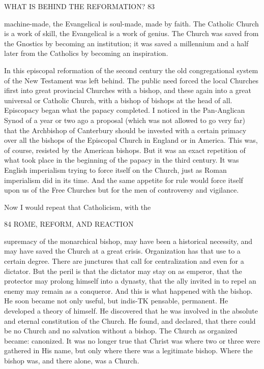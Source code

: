 \documentclass[12pt,a5paper,twoside]{book}
\begin{document}
WHAT IS BEHIND THE REFORMATION? 83 

machine-made, the Evangelical is soul-made, made by 
faith. The Catholic Church is a work of skill, the 
Evangelical is a work of genius. The Church was 
saved from the Gnostics by becoming an institution; 
it was saved a millennium and a half later from the 
Catholics by becoming an inspiration. 

In this episcopal reformation of the second century 
the old congregational system of the New Testament 
was left behind. The public need forced the local 
Churches ifirst into great provincial Churches with 
a bishop, and these again into a great universal or 
Catholic Church, with a bishop of bishops at the head 
of all. Episcopacy began what the papacy completed. 
I noticed in the Pan-Anglican Synod of a year or two 
ago a proposal (which was not allowed to go very far) 
that the Archbishop of Canterbury should be invested 
with a certain primacy over all the bishops of the 
Episcopal Church in England or in America. This 
was, of course, resisted by the American bishops. 
But it was an exact repetition of what took place in 
the beginning of the papacy in the third century. It 
was English imperialism trying to force itself on the 
Church, just as Roman imperialism did in its time. 
And the same appetite for rule would force itself 
upon us of the Free Churches but for the men of 
controversy and vigilance. 

Now I would repeat that Catholicism, with the 



84 ROME, REFORM, AND REACTION 

supremacy of the monarchical bishop, may have been a 
historical necessity, and may have saved the Church 
at a great crisis. Organization has that use to a 
certain degree. There are junctures that call for 
centralization and even for a dictator. But the peril 
is that the dictator may stay on as emperor, that the 
protector may prolong himself into a dynasty, that 
the ally invited in to repel an enemy may remain as 
a conqueror. And this is what happened with the 
bishop. He soon became not only useful, but indis-TK
pensable, permanent. He developed a theory of 
himself. He discovered that he was involved in the 
absolute and eternal constitution of the Church. He 
found, and declared, that there could be no Church 
and no salvation without a bishop. The Church as 
organized became: canonized. It was no longer true 
that Christ was where two or three were gathered in 
His name, but only where there was a legitimate 
bishop. Where the bishop was, and there alone, was 
a Church. 
\end{document}

